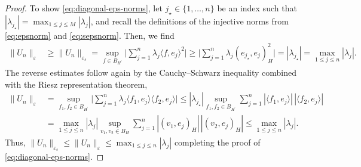 \documentclass[reqno]{amsart}
\numberwithin{equation}{section}
\newcommand{\norm}[2]{     \| #1       \|_{ #2 }}
\newcommand{\scalar}[2]{     ( #1       )_{ #2 }}
\newcommand{\duality}[1]{     \langle #1       \rangle}
\newcommand{\dual}[1]{{#1}^{\prime}}
\newcommand{\eps}{\varepsilon}
\theoremstyle{remark}
\theoremstyle{definition}
\begin{document}
\begin{proof}
	To show \eqref{eq:diagonal-eps-norms}, 
	let $j_\star\in\{1,\ldots,n\}$ be an index 
	such that 
	$| \lambda_{j_\star} | = \max_{1\leq j\leq M} |\lambda_j|$, 
	and recall the definitions of the injective norms from 
	\eqref{eq:epsnorm} and \eqref{eq:sepsnorm}. 
	Then, we find
	\begin{align*} 
		\norm{ U_n }{\eps} 
		&\geq 
		\norm{ U_n }{\eps_s} 
		= 
		\sup_{f\in B_{\dual{H}} } \biggl| \sum_{j=1}^n \lambda_j \duality{f, e_j}^2 \biggr| 
		\geq 
		\biggl| \sum_{j=1}^n \lambda_j \scalar{e_{j_\star}, e_j}{H}^2 \biggr| 
		= 
		|\lambda_{j_\star}| 
		= 
		\max_{1\leq j\leq n} |\lambda_j|. 
	\end{align*} 
	The reverse estimates follow again by the Cauchy--Schwarz inequality 
	combined with the Riesz representation theorem, 
	\begin{align*} 
		\norm{ U_n }{\eps} 
		&= 
		\sup_{f_1, f_2\in B_{\dual{H}} } 
		\biggl| \sum_{j=1}^n \lambda_j \duality{f_1, e_j} \duality{f_2, e_j} \biggr| 
		\leq 
		|\lambda_{j_\star}| 
		\sup_{f_1, f_2\in B_{\dual{H}} } 
		\sum_{j=1}^n | \duality{f_1, e_j} | \, |\duality{f_2, e_j}| 
		\\
		&=
		\max_{1\leq j\leq n} |\lambda_j| 
		\sup_{v_1, v_2\in B_H } 
		\sum_{j=1}^n | \scalar{v_1, e_j}{H} | \, |\scalar{v_2, e_j}{H}| 
		\leq 
		\max_{1\leq j\leq n} |\lambda_j|.
	\end{align*} 
	Thus, 
	$\norm{ U_n }{\eps_s} 
	\leq 
	\norm{ U_n }{\eps} 
	\leq 
	\max_{1\leq j\leq n} |\lambda_j|$ 
	completing the proof of \eqref{eq:diagonal-eps-norms}. 
\end{proof} 
\end{document}
